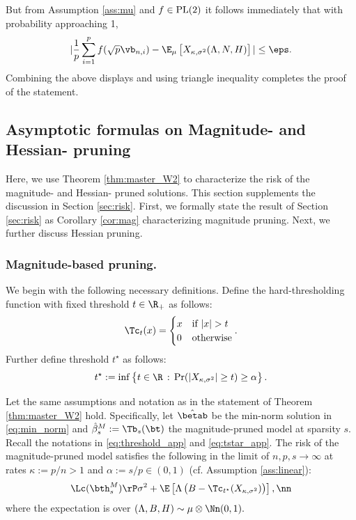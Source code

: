 But from Assumption \ref{ass:mu} and $f\in\rm{PL(2)}$ it follows immediately that with probability approaching 1,
\begin{align}
|\frac{1}{p}\sum_{i=1}^{p}f(\sqrt{p}\vb_{n,i})-\E_\mu\left[X_{\kappa,\sigma^2}(\Lambda,N,H)  \right]| \leq \eps.
\end{align}
Combining the above displays and using triangle inequality completes the proof of the statement.




\subsection{Asymptotic formulas on Magnitude- and Hessian- pruning}
Here, we use Theorem \ref{thm:master_W2} to characterize the risk of the magnitude- and Hessian- pruned solutions. This section supplements the discussion in Section \ref{sec:risk}. First, we formally state the result of Section \ref{sec:risk} as Corollary \ref{cor:mag} characterizing magnitude pruning. Next, we further discuss Hessian pruning.


\subsubsection{Magnitude-based pruning.}

We begin with the following necessary definitions.  Define the hard-thresholding function with fixed threshold $t\in\R_+$ as follows:
\begin{align}\label{eq:threshold_app}
\Tc_t(x) = \begin{cases} x & \text{if } |x|>t \\ 0 & \text{otherwise} \end{cases}.
\end{align}
Further define threshold $t^\star$ as follows:
\begin{align}\label{eq:tstar_app}
t^\star:=\inf\left\{t\in\R\,:\, \Pr(|X_{\kappa,\sigma^2}|\geq t) \geq \alpha \right\}.
\end{align}


\begin{corollary}\label{cor:mag}
Let the same assumptions and notation as in the statement of Theorem \ref{thm:master_W2} hold. Specifically, let $\hat\betab$ be the min-norm solution in \eqref{eq:min_norm} and $\hat\beta_s^M:=\Tb_s(\bt)$ the magnitude-pruned model at sparsity $s$. Recall the notations in \eqref{eq:threshold_app} and \eqref{eq:tstar_app}. The risk of the magnitude-pruned model satisfies the following in the limit of $n,p,s\rightarrow\infty$ at rates $\kappa:=p/n>1$ and $\alpha:=s/p\in(0,1)$ (cf. Assumption \ref{ass:linear}):
\begin{align}
\Lc(\bth^M_s) \rP \sigma^2 + \E\left[ \Lambda\left(B-\Tc_{t^\star}(X_{\kappa,\sigma^2})\right) \right],\nn
\end{align}
where the expectation is over $(\Lambda,B,H)\sim\mu\otimes\Nn(0,1).$
\end{corollary}


